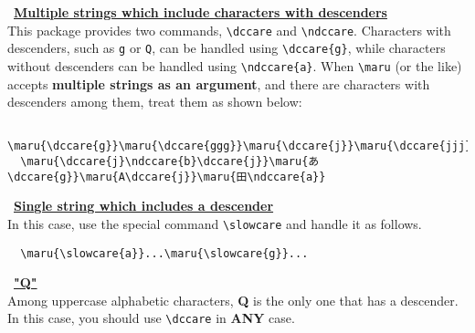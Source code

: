 \documentclass[luatex,fontsize=10pt,paper=b5,twoside]{jlreq}%
\begin{document}
\noindent\triangleright \ \underline{\bfseries Multiple strings which include characters with descenders}\\
This package provides two commands, \verb|\dccare| and \verb|\ndccare|. Characters with descenders, such as \verb|g| or \verb|Q|, can be handled using \verb|\dccare{g}|, while characters without descenders can be handled using \verb|\ndccare{a}|. When \verb|\maru| (or the like) accepts \textbf{multiple strings as an argument}, and there are characters with descenders among them, treat them as shown below:

\begin{lstlisting}
  \maru{\dccare{g}}\maru{\dccare{ggg}}\maru{\dccare{j}}\maru{\dccare{jjj}}\maru{\ndccare{a}}
  \maru{\dccare{j}\ndccare{b}\dccare{j}}\maru{あ\dccare{g}}\maru{A\dccare{j}}\maru{田\ndccare{a}}
\end{lstlisting}

\begin{quotation}

\end{quotation}

\noindent\triangleright \ \underline{\bfseries Single string which includes a descender}\\
In this case, use the special command \verb|\slowcare| and handle it as follows.

\begin{lstlisting}
  \maru{\slowcare{a}}...\maru{\slowcare{g}}...
\end{lstlisting}

\begin{quotation}
\end{quotation}

\noindent\triangleright \ \underline{\bfseries "Q"}\\
Among uppercase alphabetic characters, \textbf{Q} is the only one that has a descender. In this case, you should use \verb|\dccare| in \textbf{ANY} case.
\end{document}
